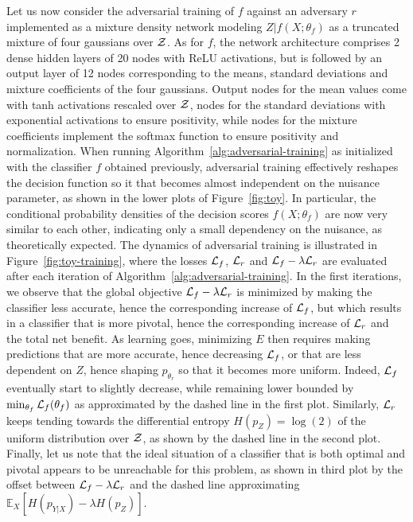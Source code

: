 \documentclass[twocolumn,superscriptaddress,aps]{revtex4-1}
\theoremstyle{plain}
\begin{document}
Let us now consider the adversarial training of $f$ against an adversary $r$
implemented as a mixture density network modeling $Z|f(X;\theta_f)$ as a
truncated mixture of four gaussians over ${\cal Z}$. As for $f$, the network
architecture comprises 2 dense hidden layers of 20 nodes with ReLU activations,
but is followed by an output layer of 12 nodes corresponding to the means,
standard deviations and mixture coefficients of the four gaussians. Output nodes
for the mean values come with tanh activations rescaled over ${\cal Z}$, nodes
for the standard deviations with exponential activations to ensure positivity,
while nodes for the mixture coefficients implement the softmax function to
ensure positivity and normalization. When running
Algorithm~\ref{alg:adversarial-training} as initialized with the classifier $f$
obtained previously, adversarial training effectively reshapes the decision
function so it that becomes almost independent on the nuisance parameter, as
shown in the lower plots of Figure~\ref{fig:toy}. In particular, the conditional
probability densities of the decision scores $f(X;\theta_f)$ are now very
similar to each other, indicating only a small  dependency on the nuisance, as
theoretically expected. The dynamics of adversarial training is illustrated in
Figure~\ref{fig:toy-training}, where the losses ${\cal L}_f$, ${\cal L}_r$ and
${\cal L}_f - \lambda {\cal L}_r$ are evaluated after each iteration of
Algorithm~\ref{alg:adversarial-training}. In the first iterations, we observe
that the global objective ${\cal L}_f - \lambda {\cal L}_r$ is minimized by
making the classifier less accurate, hence the corresponding increase of ${\cal
L}_f$, but which results in a classifier that is more pivotal, hence the
corresponding increase of ${\cal L}_r$ and the total net benefit. As learning
goes, minimizing $E$ then requires making predictions that are more accurate,
hence decreasing ${\cal L}_f$, or that are less dependent on $Z$, hence shaping
$p_{\theta_r}$ so that it becomes more uniform. Indeed, ${\cal L}_f$ eventually
start to slightly decrease, while remaining lower bounded by $\min_{\theta_f}
{\cal L}_f(\theta_f)$ as approximated by the dashed line in the first plot.
Similarly,  ${\cal L}_r$ keeps tending towards the differential entropy $H(p_Z) =
\log(2)$ of the uniform distribution over ${\cal Z}$, as shown by the dashed
line in the second plot. Finally, let us note that the ideal situation of a
classifier that is both optimal and pivotal appears to be unreachable for this
problem, as shown in third plot by the  offset between ${\cal L}_f - \lambda
{\cal L}_r$ and the dashed line approximating $\mathbb{E}_{X} [ H(p_{Y|X}) -
\lambda H(p_Z)]$.
\end{document}
